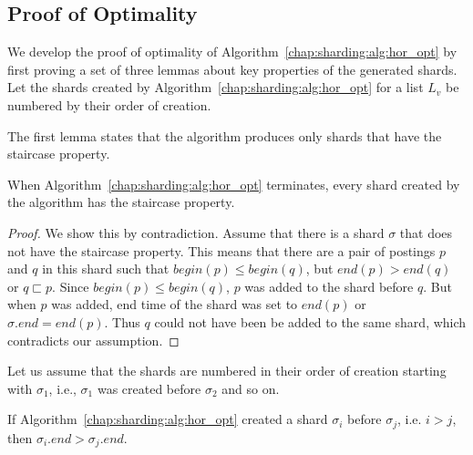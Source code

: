 \subsection{Proof of Optimality}
We develop the proof of optimality of Algorithm~\ref{chap:sharding:alg:hor_opt}
by first proving a set of three lemmas about key properties of the
generated shards. Let the shards created by
Algorithm~\ref{chap:sharding:alg:hor_opt} for a list $L_{v}$ be numbered by their
order of creation.

The first lemma states that the algorithm produces only shards that
have the staircase property.

\begin{lemma}
\label{lem:staircase_property}
		When Algorithm~\ref{chap:sharding:alg:hor_opt} terminates, every shard created by the algorithm has the staircase property.
\end{lemma}
\begin{proof}{}
We show this by contradiction. Assume that there is a shard $\sigma$ that does
 not have the staircase property. This means that there are a pair of postings 
 $p$ and $q$ in this shard such that $begin(p)\leq begin(q)$, but $end(p
 ) > end(q)$ or $q \sqsubset p$. Since $begin(p) \leq begin(q)$, $p$ was added to the shard 
 before $q$. But when $p$ was added, end time of the shard was set to $
 end(p)$ or $\sigma.end = end(p)$. Thus $q$ could not have been be added to the same shard, which contradicts our assumption.
\end{proof}

Let us assume that the shards are numbered in their order of creation starting with $\sigma_1$, i.e., $\sigma_1$ was created before $\sigma_2$ and so on.

\begin{lemma}
\label{lem:descending_endtimes}
If Algorithm~\ref{chap:sharding:alg:hor_opt} created a shard $\sigma_i$ before $\sigma_{j}$, i.e. $i > j$, then $\sigma_i.end > \sigma_{j}.end$.
\end{lemma}

